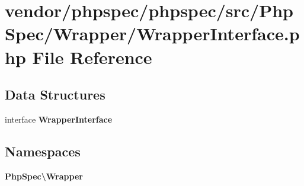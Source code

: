 \section{vendor/phpspec/phpspec/src/\+Php\+Spec/\+Wrapper/\+Wrapper\+Interface.php File Reference}
\label{_wrapper_interface_8php}
\subsection*{Data Structures}
\begin{DoxyCompactItemize}
\item 
interface {\bf Wrapper\+Interface}
\end{DoxyCompactItemize}
\subsection*{Namespaces}
\begin{DoxyCompactItemize}
\item 
 {\bf Php\+Spec\textbackslash{}\+Wrapper}
\end{DoxyCompactItemize}
